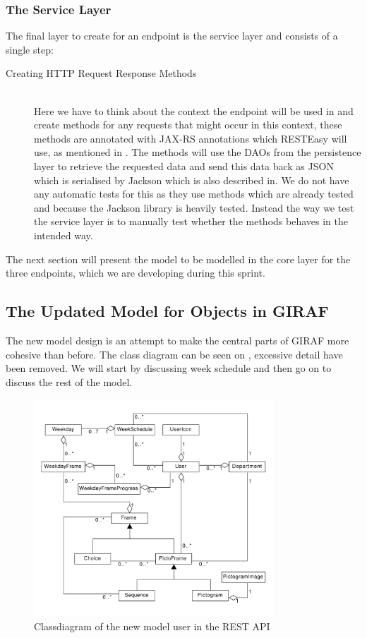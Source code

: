 \subsubsection{The Service Layer}
The final layer to create for an endpoint is the service layer and consists of a single step:
\begin{description}
	\item[Creating HTTP Request Response Methods]\hfill \\
	Here we have to think about the context the endpoint will be used in and create methods for any requests that might occur in this context, these methods are annotated with JAX-RS annotations which RESTEasy will use, as mentioned in .
	The methods will use the DAOs from the persistence layer to retrieve the requested data and send this data back as JSON which is serialised by Jackson which is also described in.
	We do not have any automatic tests for this as they use methods which are already tested and because the Jackson library is heavily tested.
	Instead the way we test the service layer is to manually test whether the methods behaves in the intended way.
\end{description}
\noindent
The next section will present the model to be modelled in the core layer for the three endpoints, which we are developing during this sprint.

\subsection{The Updated Model for Objects in GIRAF}\label{subsec:model}
The new model design is an attempt to make the central parts of GIRAF more cohesive than before.
The class diagram can be seen on , excessive detail have been removed.
We will start by discussing week schedule and then go on to discuss the rest of the model.

\begin{figure}[h]
    \centering
    \includegraphics[width=0.8\textwidth]{figures/fullclassdiagram.pdf}
    \caption{Classdiagram of the new model user in the REST API}\label{fig:fullmodelclassdiagram}
\end{figure}

